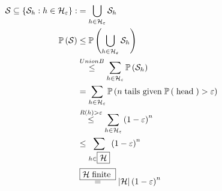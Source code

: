 \documentclass{article}
\begin{document}
\begin{align*}
\mathcal{S} \subseteq \left\{\mathcal{S}_{h} : h \in \mathcal{H}_{\varepsilon}\right\} :&= \displaystyle\bigcup _{h \in \mathcal{H}_{\varepsilon}} \mathcal{S}_{h}
\\ \mathbb{P}\left(\mathcal{S}\right) &\leq  \mathbb{P}\left(\displaystyle\bigcup _{h \in \mathcal{H}_{\varepsilon}} \mathcal{S}_{h}\right)
\\ &\stackrel{Union B}{\leq} \displaystyle\sum_{h \in \mathcal{H}_{\varepsilon}} \mathbb{P}\left(\mathcal{S}_{h}\right)
\\ &= \displaystyle\sum_{h \in \mathcal{H}_{\varepsilon}} \mathbb{P}\left(n \text{\;tails given\;} \mathbb{P}\left(\text{\;head\;}\right) > \varepsilon\right)
\\ &\stackrel{R\left(h\right) > \varepsilon}{\leq} \displaystyle\sum_{h \in \mathcal{H}_{\varepsilon}} \left(1 - \varepsilon\right)^{n}
\\ &\leq  \displaystyle\sum_{h \in \boxed{\mathcal{H}}} \left(1 - \varepsilon\right)^{n}
\\ &\stackrel{\boxed{\mathcal{H} \text{\;finite\;}}}{=} | \mathcal{H} | \left(1 - \varepsilon\right)^{n}
\end{align*}
\end{document}
